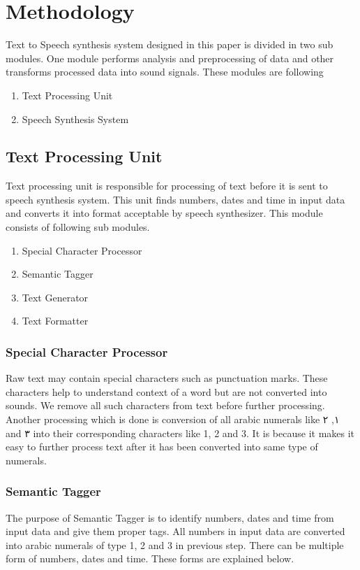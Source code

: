 \chapter{Methodology}

Text to Speech synthesis system designed in this paper is divided in two sub modules. One module performs analysis and preprocessing of 
data and other transforms processed data into sound signals. These modules are following

\begin{enumerate}
  \item Text Processing Unit
  \item Speech Synthesis System
\end{enumerate}

\section{Text Processing Unit}
Text processing unit is responsible for processing of text before it is sent to speech synthesis system. This unit finds numbers, dates and time in input data and converts it into format acceptable by speech synthesizer. This module consists of following sub modules.

\begin{enumerate}
  \item Special Character Processor
  \item Semantic Tagger  
  \item Text Generator
  \item Text Formatter 
\end{enumerate}


\subsection{Special Character Processor}

Raw text may contain special characters such as punctuation marks. These characters help to understand context of a word but 
are not converted into sounds. We remove all such characters from text before further processing. 
Another processing which is done is conversion of all arabic numerals like \textarabic{١}, \textarabic{٢} and \textarabic{٣} into their corresponding 
characters like 1, 2 and 3. It is because it makes it easy to further process text after it has been converted into same type of numerals.

\subsection{Semantic Tagger}
The purpose of Semantic Tagger is to identify numbers, dates and time from input data and give them proper tags. 
All numbers in input data are converted into arabic numerals of type 1, 2 and 3 in previous step. 
There can be multiple form of numbers, dates and time. These forms are explained below.


